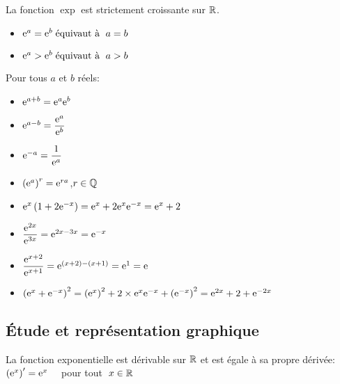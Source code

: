 \begin{property}
La fonction $ \exp $  est  strictement croissante  sur $ \mathbb{R} $.

\begin{itemize}
 \item[\textbullet] $ \mathrm{e}^{a}=\mathrm{e}^{b}\; \text{équivaut à }\;  a=b $
   \item[\textbullet] $ \mathrm{e}^{a}> \mathrm{e}^{b}  \; \text{équivaut à }\;  a>b $
   \end{itemize}
\end{property}
\begin{property}
Pour tous $ a $ et $ b $  réels:

\begin{itemize}
\item[\textbullet] $\mathrm{e}^{a+b} =\mathrm{e}^{a}\mathrm{e}^{b} $
\item[\textbullet] $ \mathrm{e}^{a-b }=\dfrac{\mathrm{e}^{a}}{\mathrm{e}^{b} }$
\item[\textbullet] $ \mathrm{e}^{-a }=\dfrac{1}{\mathrm{e}^{a} }$
\item[\textbullet] $ \left(\mathrm{e}^{a }\right)^{r}= \mathrm{e}^{ra }$,\quad $  r\in\mathbb{Q} $
\end{itemize}
\end{property}

\begin{example}
\begin{itemize}
\item[\textbullet] $\mathrm{e}^{x}\left(1+2\mathrm{e}^{-x}\right) =\mathrm{e}^{x}+2\mathrm{e}^{x}\mathrm{e}^{-x}=\mathrm{e}^{x}+2$
\item[\textbullet] $ \dfrac{\mathrm{e}^{2x}}{\mathrm{e}^{3x}}=\mathrm{e}^{2x-3x}=\mathrm{e}^{-x}$
\item[\textbullet] $ \dfrac{\mathrm{e}^{x+2}}{\mathrm{e}^{x+1}} =\mathrm{e}^{(x+2)-(x+1)}=\mathrm{e}^{1}=\mathrm{e}^{}$
\item[\textbullet] $ \left(\mathrm{e}^{x}+\mathrm{e}^{-x}\right)^{2}=\left(\mathrm{e}^{x}\right)^{2} +2\times \mathrm{e}^{x}\mathrm{e}^{-x}+\left(\mathrm{e}^{-x}\right)^{2}=\mathrm{e}^{2x}+2+\mathrm{e}^{-2x}$
\end{itemize}
\end{example}

\subsection{Étude et représentation graphique}
\begin{property}[Dérivée]
 La fonction exponentielle est dérivable sur $ \mathbb{R} $ et est égale à sa propre dérivée:\\
 
 $ \left( \mathrm{e}^{x}\right)^{\prime}=\mathrm{e}^{x}  \quad$ pour tout  $\; x \in \mathbb{R} $

\end{property}


